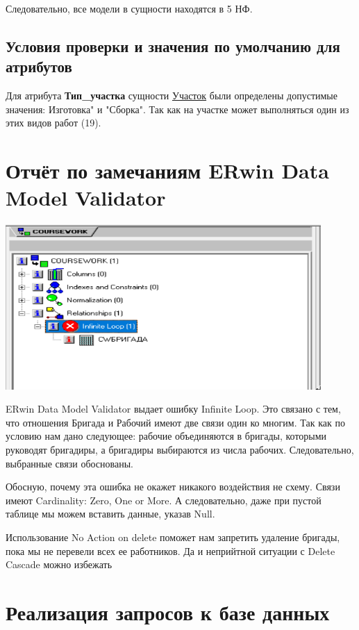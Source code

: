 Следовательно, все модели в сущности находятся в 5 НФ.

\subsection{Условия проверки и значения по умолчанию для атрибутов}

Для атрибута {\bf Тип\_участка} сущности \underline{Участок} были определены допустимые значения: Изготовка" и "Сборка".
Так как на участке может выполняться один из этих видов работ (19).

\section {Отчёт по замечаниям ERwin Data Model Validator}

\includegraphics[width=12cm]{./screenshots/validator/validator.png}

ERwin Data Model Validator выдает ошибку Infinite Loop.
Это связано с тем, что отношения Бригада и Рабочий имеют две связи один ко многим.
Так как по условию нам дано следующее: рабочие объединяются в бригады, которыми руководят бригадиры, а бригадиры выбираются из числа рабочих.
Следовательно, выбранные связи обоснованы.

Обосную, почему эта ошибка не окажет никакого воздействия не схему.
Связи имеют Cardinality: Zero, One or More.
А следовательно, даже при пустой таблице мы можем вставить данные, указав Null.

Использование No Action on delete поможет нам запретить удаление бригады, пока мы не перевели всех ее работников.
Да и неприйтной ситуации с Delete Cascade можно избежать

\section{Реализация запросов к базе данных}

